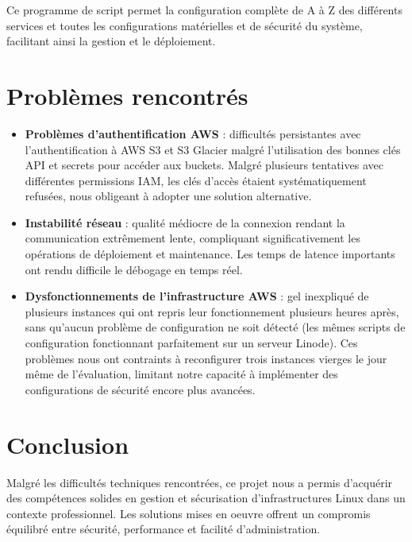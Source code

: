 \documentclass[a4paper,12pt]{article}
\begin{document}
\FloatBarrier

Ce programme de script permet la configuration complète de A à Z des différents services et toutes les configurations matérielles et de sécurité du système, facilitant ainsi la gestion et le déploiement.
\newpage
\section{Problèmes rencontrés}

\begin{itemize}
	\item \textbf{Problèmes d'authentification AWS} : difficultés persistantes avec l'authentification à AWS S3 et S3 Glacier malgré l'utilisation des bonnes clés API et secrets pour accéder aux buckets. Malgré plusieurs tentatives avec différentes permissions IAM, les clés d'accès étaient systématiquement refusées, nous obligeant à adopter une solution alternative.
	
	\item \textbf{Instabilité réseau} : qualité médiocre de la connexion rendant la communication extrêmement lente, compliquant significativement les opérations de déploiement et maintenance. Les temps de latence importants ont rendu difficile le débogage en temps réel.
	
	\item \textbf{Dysfonctionnements de l'infrastructure AWS} : gel inexpliqué de plusieurs instances qui ont repris leur fonctionnement plusieurs heures après, sans qu'aucun problème de configuration ne soit détecté (les mêmes scripts de configuration fonctionnant parfaitement sur un serveur Linode). Ces problèmes nous ont contraints à reconfigurer trois instances vierges le jour même de l'évaluation, limitant notre capacité à implémenter des configurations de sécurité encore plus avancées.
\end{itemize}

\section{Conclusion}

Malgré les difficultés techniques rencontrées, ce projet nous a permis d'acquérir des compétences solides en gestion et sécurisation d'infrastructures Linux dans un contexte professionnel. Les solutions mises en oeuvre offrent un compromis équilibré entre sécurité, performance et facilité d'administration.
\end{document}

